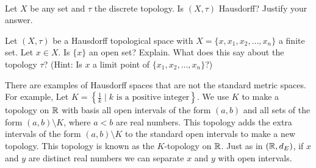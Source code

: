 \begin{activity} ~
\ba
\item Let $X$ be any set and $\tau$ the discrete topology. Is $(X, \tau)$ Hausdorff? Justify your answer.

\item Let $(X, \tau)$ be a Hausdorff topological space with $X = \{x, x_1, x_2, \ldots, x_n\}$ a finite set. Let $x \in X$. Is $\{x\}$ an open set? Explain. What does this say about the topology $\tau$? (Hint: Is $x$ a limit point of $\{x_1, x_2, \ldots, x_n\}$?)

\ea

\end{activity}

\begin{comment}

\ActivitySolution

\ba
\item Let $x$ and $y$ be distinct elements in $X$. Since every subset of $X$ is open, the disjoint open set $\{x\}$ and $\{y\}$ separate $x$ and $y$. So $(X, \tau)$ is Hausdorff.

\item Suppose $X = \{x, x_1, x_2, \ldots, x_n\}$. Let $A = \{x_1, x_2, \ldots, x_n\}$. We will show that $A$ is closed by demonstrating that $A$ contains all of its limit points. To do this we only need to show that $x$ is not a limit point of $A$. Since $X$ is Hausdorff, for each $i$ there exists an open sets $Ox_i$ and $O_i$ such that $Ox_i \cap O_i = \emptyset$. Let $O = \cap Ox_i$. Then $O$ is neighborhood of $x$ and $O \cap O_i = \emptyset$ for every $i$. Thus, $O$ does not contain any points in $A$. Since $A$ is closed, it follows that $\{x\} = X \setminus A$ is open. Since every single element set is open, the topology $\tau$ is the discrete topology. 

\ea

\end{comment}

\begin{example} \label{exp:K_topology} There are examples of Hausdorff spaces that are not the standard metric spaces. For example, Let  $K = \left\{\frac{1}{k} \mid k \text{ is a positive integer} \right\}$. We use $K$ to make a topology on $\mathbb{R}$ with basis all open intervals of the form $(a,b)$ and all sets of the form $(a,b) \setminus K$, where $a < b$ are real numbers. This topology adds the extra intervals of the form $(a,b) \setminus K$ to the standard open intervals to make a new topology. This topology is known as the $K$-topology on $\mathbb{R}$. Just as in $(\mathbb{R}, d_E)$, if $x$ and $y$ are distinct real numbers we can separate $x$ and $y$ with open intervals. 


\end{example}

